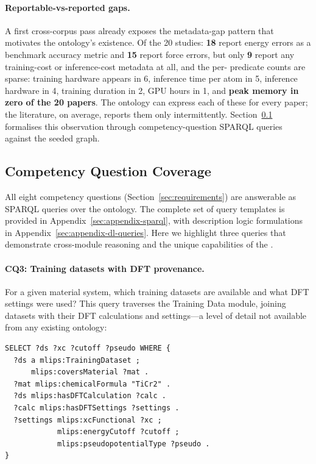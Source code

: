 \paragraph{Reportable-vs-reported gaps.}
A first cross-corpus pass already exposes the metadata-gap pattern
that motivates the ontology's existence. Of the 20 studies:
\textbf{18} report energy errors as a benchmark accuracy metric and
\textbf{15} report force errors, but only \textbf{9} report any
training-cost or inference-cost metadata at all, and the per-
predicate counts are sparse: training hardware appears in 6,
inference time per atom in 5, inference hardware in 4, training
duration in 2, GPU hours in 1, and \textbf{peak memory in zero of the
20 papers}. The ontology can express each of these for every paper;
the literature, on average, reports them only intermittently.
Section~\ref{sec:eval-cq} formalises this observation through
competency-question SPARQL queries against the seeded graph.

\subsection{Competency Question Coverage}
\label{sec:eval-cq}

All eight competency questions (Section~\ref{sec:requirements}) are
answerable as SPARQL queries over the ontology. The complete set of query
templates is provided in Appendix~\ref{sec:appendix-sparql}, with
description logic formulations in Appendix~\ref{sec:appendix-dl-queries}.
Here we highlight three queries that demonstrate cross-module reasoning
and the unique capabilities of the \MLIPsOntology{}.


\paragraph{CQ3: Training datasets with DFT provenance.}
For a given material system, which training datasets are available and
what DFT settings were used? This query traverses the Training Data
module, joining datasets with their DFT calculations and settings---a
level of detail not available from any existing ontology:
%
\begin{lstlisting}[language=sparql]
SELECT ?ds ?xc ?cutoff ?pseudo WHERE {
  ?ds a mlips:TrainingDataset ;
      mlips:coversMaterial ?mat .
  ?mat mlips:chemicalFormula "TiCr2" .
  ?ds mlips:hasDFTCalculation ?calc .
  ?calc mlips:hasDFTSettings ?settings .
  ?settings mlips:xcFunctional ?xc ;
            mlips:energyCutoff ?cutoff ;
            mlips:pseudopotentialType ?pseudo .
}
\end{lstlisting}

